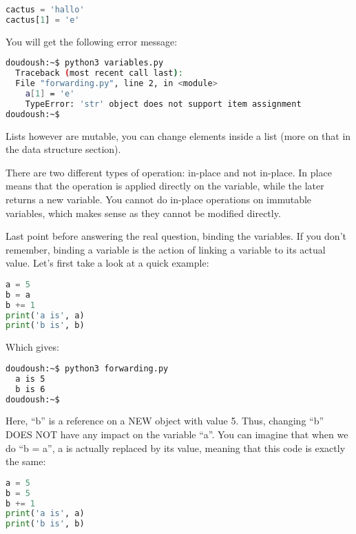 \begin{lstlisting}[language=python]
cactus = 'hallo'
cactus[1] = 'e'
\end{lstlisting}

You will get the following error message:

\begin{lstlisting}[language=bash]
doudoush:~$ python3 variables.py
  Traceback (most recent call last):
  File "forwarding.py", line 2, in <module>
    a[1] = 'e'
    TypeError: 'str' object does not support item assignment
doudoush:~$
\end{lstlisting}

Lists however are mutable, you can change elements inside a list
(more on that in the data structure section).

\vspace{5mm}

There are two different types of operation: in-place and not in-place.
In place means that the operation is applied directly on the variable, while the later
returns a new variable. You cannot do in-place operations on immutable variables,
which makes sense as they cannot be modified directly.

\vspace{5mm}

Last point before answering the real question, binding the variables. If you don't
remember, binding a variable is the action of linking a variable to its actual value.
Let's first take a look at a quick example:

\begin{lstlisting}[language=python]
a = 5
b = a
b += 1
print('a is', a)
print('b is', b)
\end{lstlisting}

Which gives:

\begin{lstlisting}[language=bash]
doudoush:~$ python3 forwarding.py
  a is 5
  b is 6
doudoush:~$
\end{lstlisting}

Here, ``b'' is a reference on a NEW object with value 5. Thus, changing ``b'' DOES NOT have any impact
on the variable ``a''. You can imagine that when we do ``b = a'', a is actually replaced by its value,
meaning that this code is exactly the same:

\begin{lstlisting}[language=python]
a = 5
b = 5
b += 1
print('a is', a)
print('b is', b)
\end{lstlisting}

